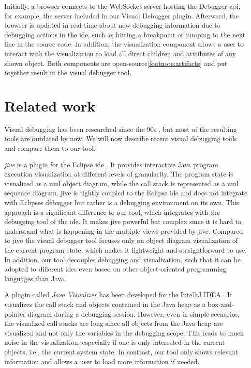 \documentclass[conference]{IEEEtran}
\newcommand{\intellij}{IntelliJ IDEA}
\begin{document}
Initially, a browser connects to the WebSocket server hosting the Debugger \gls*{api}, for example, the server included in our Visual Debugger plugin.
Afterward, the browser is updated in real-time about new debugging information due to debugging actions in the \gls*{ide}, such as hitting a breakpoint or jumping to the next line in the source code.
In addition, the visualization component allows a user to interact with the visualization to load all direct children and attributes of any shown object.
Both components are open-source\cref{footnote:artifacts} and put together result in the visual debugger tool.

\section{Related work} \label{sec:relatedWork}
Visual debugging has been researched since the 90s \cite{baeza-yatesVisualDebuggingAutomatic1996, jerdingUsingVisualizationFoster1994, mukherjeaVisualDebuggingIntegrating1994, hansonSimpleExtensibleGraphical1997}, but most of the resulting tools are outdated by now.
We will now describe recent visual debugging tools and compare them to our tool.

\textit{\gls*{jive}} is a plugin for the Eclipse \gls*{ide} \cite{czyzDeclarativeVisualDebugging2007,k.p.FiniteStateModel2021, JIVEJavaInteractive}.
It provides interactive Java program execution visualization at different levels of granularity.
The program state is visualized as a \gls*{uml} object diagram, while the call stack is represented as a \gls*{uml} sequence diagram.
\gls*{jive} is tightly coupled to the Eclipse \gls*{ide} and does not integrate with Eclipses debugger but rather is a debugging environment on its own.
This approach is a significant difference to our tool, which integrates with the debugging tool of the \gls*{ide}.
It makes \gls*{jive} powerful but complex since it is hard to understand what is happening in the multiple views provided by \gls*{jive}.
Compared to \gls*{jive} the visual debugger tool focuses only on object diagram visualization of the current program state, which makes it lightweight and straightforward to use.
In addition, our tool decouples debugging and visualization, such that it can be adopted to different \glspl*{ide} even based on other object-oriented programming languages than Java.

A plugin called \textit{Java Visualizer} has been developed for the \intellij{} \cite{JavaVisualizerIntelliJ}.
It visualizes the call stack and objects contained in the Java heap as a box-and-pointer diagram during a debugging session.
However, even in simple scenarios, the visualized call stacks are long since all objects from the Java heap are visualized and not only the variables in the debugging scope.
This leads to much noise in the visualization, especially if one is only interested in the current objects, i.e., the current system state.
In contrast, our tool only shows relevant information and allows a user to load more information if needed.
\end{document}
